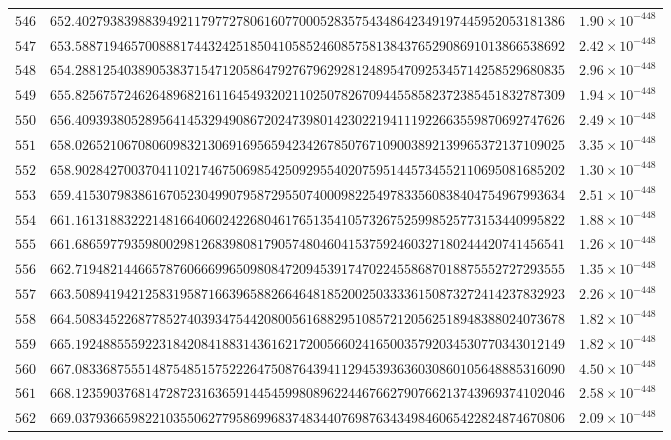 \documentclass[12pt,reqno]{amsart}
\theoremstyle{remark}
\begin{document}
\begin{longtable}{clc}
$546$ & $652.4027938398839492117977278061607700052835754348642349197445952053181386$ & $1.90\times 10^{-448}$ \\
$547$ & $653.5887194657008881744324251850410585246085758138437652908691013866538692$ & $2.42\times 10^{-448}$ \\
$548$ & $654.2881254038905383715471205864792767962928124895470925345714258529680835$ & $2.96\times 10^{-448}$ \\
$549$ & $655.8256757246264896821611645493202110250782670944558582372385451832787309$ & $1.94\times 10^{-448}$ \\
$550$ & $656.4093938052895641453294908672024739801423022194111922663559870692747626$ & $2.49\times 10^{-448}$ \\
$551$ & $658.0265210670806098321306916956594234267850767109003892139965372137109025$ & $3.35\times 10^{-448}$ \\
$552$ & $658.9028427003704110217467506985425092955402075951445734552110695081685202$ & $1.30\times 10^{-448}$ \\
$553$ & $659.4153079838616705230499079587295507400098225497833560838404754967993634$ & $2.51\times 10^{-448}$ \\
$554$ & $661.1613188322214816640602422680461765135410573267525998525773153440995822$ & $1.88\times 10^{-448}$ \\
$555$ & $661.6865977935980029812683980817905748046041537592460327180244420741456541$ & $1.26\times 10^{-448}$ \\
$556$ & $662.7194821446657876066699650980847209453917470224558687018875552727293555$ & $1.35\times 10^{-448}$ \\
$557$ & $663.5089419421258319587166396588266464818520025033336150873272414237832923$ & $2.26\times 10^{-448}$ \\
$558$ & $664.5083452268778527403934754420800561688295108572120562518948388024073678$ & $1.82\times 10^{-448}$ \\
$559$ & $665.1924885559223184208418831436162172005660241650035792034530770343012149$ & $1.82\times 10^{-448}$ \\
$560$ & $667.0833687555148754851575222647508764394112945393636030860105648885316090$ & $4.50\times 10^{-448}$ \\
$561$ & $668.1235903768147287231636591445459980896224467662790766213743969374102046$ & $2.58\times 10^{-448}$ \\
$562$ & $669.0379366598221035506277958699683748344076987634349846065422824874670806$ & $2.09\times 10^{-448}$ \\

\end{longtable}
\end{document}
